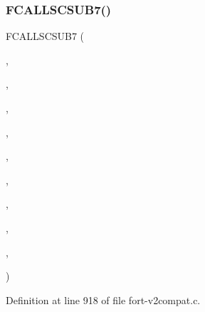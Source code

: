 \subsubsection{\texorpdfstring{F\+C\+A\+L\+L\+S\+C\+S\+U\+B7()}{FCALLSCSUB7()}\hspace{0.1cm}{\footnotesize\ttfamily [1/4]}}
{\footnotesize\ttfamily F\+C\+A\+L\+L\+S\+C\+S\+U\+B7 (\begin{DoxyParamCaption}\item[{\hyperlink{nf__v2compat_8c_add9961f97a96ff8a834bdc8da533ef4e}{c\+\_\+ncvptc}}]{,  }\item[{N\+C\+V\+P\+TC}]{,  }\item[{\hyperlink{nf__fortv2_8f90_a6c95aa587ee368266d7727735158957f}{ncvptc}}]{,  }\item[{N\+C\+ID}]{,  }\item[{V\+A\+R\+ID}]{,  }\item[{C\+O\+O\+R\+DS}]{,  }\item[{C\+O\+U\+N\+TS}]{,  }\item[{C\+B\+UF}]{,  }\item[{\hyperlink{fort-v2compat_8c_afcbdb4ceefc87947c1f6254df71bdb36}{L\+E\+N\+S\+TR}}]{,  }\item[{\hyperlink{fort-v2compat_8c_ae2352f39cbd25bcaf1bedbbb12db73fe}{P\+R\+C\+O\+DE}}]{ }\end{DoxyParamCaption})}



Definition at line 918 of file fort-\/v2compat.\+c.

\mbox{\label{fort-v2compat_8c_a46ec598b1b68f552a6a9886330e8e9fb}} 
